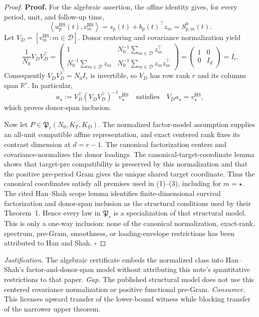 \documentclass{article}
\begin{document}
\begin{proof}
\textbf{Proof.}
For the algebraic assertion, the affine identity gives, for every period, unit, and follow-up time,
\[
 \left\langle u_p^{\mathrm{HS}}(t),v_m^{\mathrm{HS}}\right\rangle
 =s_p(t)+b_p(t)^\top z_m
 =S^0_{p,m}(t).                                           \tag{1}
\]
Let \(V_D=[v_m^{\mathrm{HS}}:m\in\mathcal D]\).  Donor centering and covariance normalization yield
\[
 \frac1{N_0}V_DV_D^\top
 =\begin{pmatrix}
  1&N_0^{-1}\sum_{m\in\mathcal D}z_m^\top\\
  N_0^{-1}\sum_{m\in\mathcal D}z_m&
  N_0^{-1}\sum_{m\in\mathcal D}z_mz_m^\top
 \end{pmatrix}
 =\begin{pmatrix}1&0\\0&I_d\end{pmatrix}
 =I_r.                                                     \tag{2}
\]
Consequently \(V_DV_D^\top=N_0I_r\) is invertible, so \(V_D\) has row rank \(r\) and its columns span \(\mathbb R^r\).  In particular,
\[
 a_\star:=V_D^\top(V_DV_D^\top)^{-1}v_\star^{\mathrm{HS}}
 \quad\text{satisfies}\quad
 V_Da_\star=v_\star^{\mathrm{HS}},                       \tag{3}
\]
which proves donor-span inclusion.

Now let \(P\in\mathfrak P_r(N_0,K_T,K_D)\).  The normalized factor-model assumption supplies an all-unit compatible affine representation, and exact centered rank fixes its contrast dimension at \(d=r-1\).  The canonical factorization centers and covariance-normalizes the donor loadings.  The canonical-target-coordinate lemma shows that target-pre compatibility is preserved by this normalization and that the positive pre-period Gram gives the unique shared target coordinate.  Thus the canonical coordinates satisfy all premises used in (1)--(3), including for \(m=\star\).  The cited Han--Shah scope lemma identifies finite-dimensional survival factorization and donor-span inclusion as the structural conditions used by their Theorem~1.  Hence every law in \(\mathfrak P_r\) is a specialization of that structural model.  This is only a one-way inclusion: none of the canonical normalization, exact-rank, spectrum, pre-Gram, smoothness, or loading-envelope restrictions has been attributed to Han and Shah. \(\square\)
\end{proof}
\par\smallskip\noindent \textit{Justification.} The algebraic certificate embeds the normalized class into Han--Shah's factor-and-donor-span model without attributing this note's quantitative restrictions to that paper. \textit{Gap.} The published structural model does not use this centered covariance normalization or positive functional pre-Gram. \textit{Consumer.} This licenses upward transfer of the lower-bound witness while blocking transfer of the narrower upper theorem.
\end{document}
